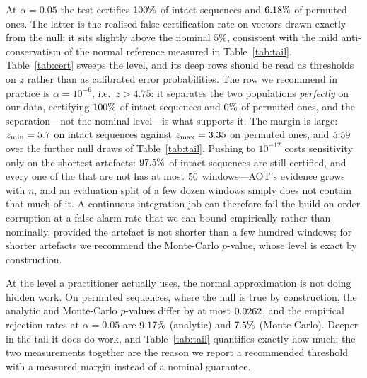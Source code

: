 \documentclass[a4paper,fleqn]{cas-sc}
\newcommand{\fitwidth}[1]{%
  \resizebox{\ifdim\width>\linewidth \linewidth\else \width\fi}{!}{#1}}
\begin{document}
At $\alpha = 0.05$ the test certifies $100\%$ of intact sequences and
$6.18\%$ of permuted ones. The latter is the realised false
certification rate on vectors drawn exactly from the null; it sits slightly above
the nominal $5\%$, consistent with the mild anti-conservatism of the normal
reference measured in Table~\ref{tab:tail}. Table~\ref{tab:cert} sweeps the level,
and its deep rows should be read as thresholds on $z$ rather than as calibrated
error probabilities. The row we recommend in practice is $\alpha = 10^{-6}$,
i.e.\ $z > 4.75$: it separates the two populations \emph{perfectly} on our data,
certifying $100\%$ of intact sequences and
$0\%$ of permuted ones, and the separation---not the nominal
level---is what supports it. The margin is large: $z_{\min} = 5.7{}$ on
intact sequences against $z_{\max} = 3.35{}$ on
\NumSequences{} permuted ones, and $5.59{}$ over the further
\NumTailNullDraws{} null draws of Table~\ref{tab:tail}. Pushing to $10^{-12}$
costs sensitivity only on the shortest artefacts:
$97.5\%$ of intact sequences are still certified, and every one
of the \NumCertTwelveMissSeq{} that are not has at most $50{}$
windows---AOT's evidence grows with $n$, and an evaluation split of a few dozen
windows simply does not contain that much of it. A continuous-integration job can
therefore fail the build on order corruption at a false-alarm rate that we can
bound empirically rather than nominally, provided the artefact is not shorter than
a few hundred windows; for shorter artefacts we recommend the Monte-Carlo
$p$-value, whose level is exact by construction.

\begin{table}[t]
\centering
\caption{AOT certification rates as a function of the level, over
\NumSequences{} real sequences and their uniform permutations. Generated from
\texttt{artifacts/certification.csv}.}
\label{tab:cert}
\fitwidth{}
\end{table}

At the level a practitioner actually uses, the normal approximation is not doing
hidden work. On \NumCalibSeq{} permuted sequences, where the null is true by
construction, the analytic and Monte-Carlo $p$-values differ by at most
$0.0262{}$, and the empirical rejection rates at $\alpha = 0.05$ are
$9.17\%$ (analytic) and $7.5\%$ (Monte-Carlo). Deeper
in the tail it does do work, and Table~\ref{tab:tail} quantifies exactly how much;
the two measurements together are the reason we report a recommended threshold
with a measured margin instead of a nominal guarantee.
\end{document}
